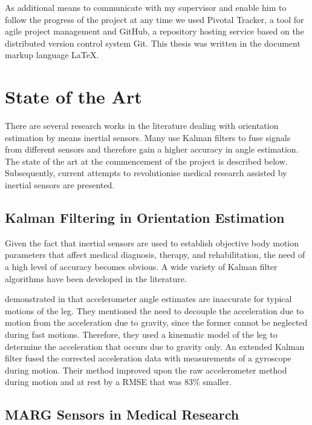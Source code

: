 As additional means to communicate with my supervisor and enable him to follow the progress of the project at any time we used Pivotal Tracker, a tool for agile project management and GitHub, a repository hosting service based on the distributed version control system Git. This thesis was written in the document markup language \LaTeX{}.

\section{State of the Art}\label{sec:state_of_the_art}

There are several research works in the literature dealing with orientation estimation by means inertial sensors. Many use Kalman filters to fuse signals from different sensors and therefore gain a higher accuracy in angle estimation. The state of the art at the commencement of the project is described below. Subsequently, current attempts to revolutionise medical research assisted by inertial sensors are presented.

\subsection{Kalman Filtering in Orientation Estimation}

Given the fact that inertial sensors are used to establish objective body motion parameters that affect medical diagnosis, therapy, and rehabilitation, the need of a high level of accuracy becomes obvious. A wide variety of Kalman filter algorithms have been developed in the literature.

\citeauthor{bennett_motion_2014} demonstrated in \cite{bennett_motion_2014} that accelerometer angle estimates are inaccurate for typical motions of the leg. They mentioned the need to decouple the acceleration due to motion from the acceleration due to gravity, since the former cannot be neglected during fast motions. Therefore, they used a kinematic model of the leg to determine the acceleration that occurs due to gravity only. An extended Kalman filter fused the corrected acceleration data with measurements of a gyroscope during motion. Their method improved upon the raw accelerometer method during motion and at rest by a RMSE that was 83\% smaller.

\subsection{MARG Sensors in Medical Research}\label{sec:MARG_sensors_medical}

